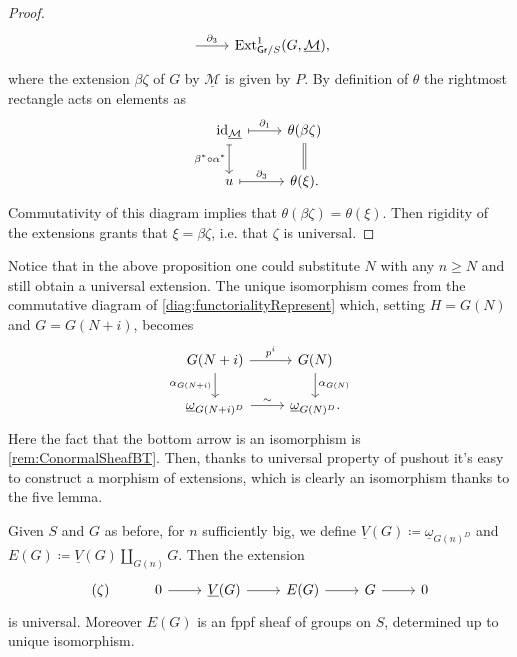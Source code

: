 \begin{proof}
\begin{equation*}
\begin{tikzcd}
		\arrow[r, "\partial_3", rightarrow] &
		\mathrm{Ext}^1_{\mathsf{Gr}/S}
		(G,\underline{\mathcal{M}})
	,\end{tikzcd}
	\end{equation*}
	where the extension $\beta\zeta$ of $G$ by $\underline{\mathcal{M}}$ is given by $P$.
	By definition of $\theta$ the rightmost rectangle acts on elements as
	\begin{equation*}
	\begin{tikzcd}
		\mathrm{id}_{ \underline{\mathcal{M}} }
		\arrow[r, "\partial_1", mapsto] 
		\arrow[d, "\beta^* \circ \alpha^*"', mapsto] &
		\theta(\beta\zeta)
		\arrow[d, "", equal] \\
		u \arrow[r, "\partial_3", mapsto] &
		\theta(\xi)
	.\end{tikzcd}
	\end{equation*}
	Commutativity of this diagram implies that $\theta(\beta\zeta) = \theta(\xi)$.
	Then rigidity of the extensions grants that $\xi = \beta\zeta$, i.e.
	that $\zeta$ is universal.
\end{proof}


\begin{rem}
	Notice that in the above proposition one could substitute
	$N$ with any $n \geq N$ and still obtain a universal extension.
	The unique isomorphism comes from the commutative diagram
	of \cref{diag:functorialityRepresent}
	which, setting $H = G(N)$ and $G = G(N+i)$, becomes
	\begin{equation*}
	\begin{tikzcd}
		G(N+i) \arrow[r, "p^i", rightarrow] 
		\arrow[d, "\alpha_{G(N+i)}"', rightarrow] &
		G(N) \arrow[d, "\alpha_{G(N)}", rightarrow] \\
		\underline{\omega}_{G(N+i)^D} \arrow[r, "\sim", rightarrow] &
		\underline{\omega}_{G(N)^D}
	.\end{tikzcd}
	\end{equation*}
	Here the fact that the bottom arrow is an isomorphism
	is \cref{rem:ConormalSheafBT}.
	Then, thanks to universal property of pushout it's easy to construct
	a morphism of extensions, which is clearly an isomorphism
	thanks to the five lemma.
\end{rem}


\begin{defn}[]
	Given $S$ and $G$ as before, for $n$ sufficiently big, we define
	$\underline{V}(G) \coloneqq \underline{\omega}_{G(n)^D}$ and
	$E(G) \coloneqq \underline{V}(G) \amalg_{G(n)} G$.
	Then the extension
	\begin{equation*}
	\begin{tikzcd}
		(\zeta) &
		0 \arrow[r, "", rightarrow] &
		\underline{V}(G) \arrow[r, "", rightarrow] &
		E(G) \arrow[r, "", rightarrow] &
		G \arrow[r, "", rightarrow] &
		0
	\end{tikzcd}
	\end{equation*}
	is universal.
	Moreover $E(G)$ is an fppf sheaf of groups on $S$,
	determined up to unique isomorphism.
\end{defn}


